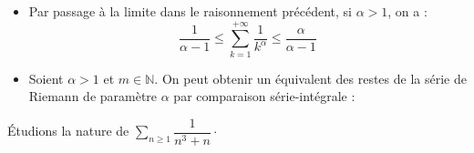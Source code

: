 \documentclass[french,11pt,twoside]{VcCours}
\newcommand{\dx}{\text{d}x}
\newcommand{\Sum}[2]{\ensuremath{\textstyle{\sum\limits_{#1}^{#2}}}}
\begin{document}
\begin{Remarques}{}
	\begin{itemize}
		\item Par passage à la limite dans le raisonnement précédent, si $\alpha>1$, on a :
$$ \frac{1}{\alpha-1} \leq \sum_{k=1}^{+ \infty} \frac{1}{k^{\alpha}} \leq  \frac{\alpha}{\alpha-1}$$
\item Soient $\alpha >1$ et $m \in \mathbb{N}$. On peut obtenir un équivalent des restes de la série de Riemann de paramètre $\alpha$ par comparaison série-intégrale :
%

\vspace{13cm}
\end{itemize}
\end{Remarques}

\begin{Exemple} Étudions la nature de $\Sum{n \geq 1}{} \dfrac{1}{n^3+n} \cdot$

\vspace{3cm}
\end{Exemple}
\end{document}

